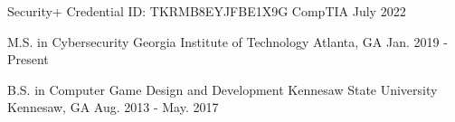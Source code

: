 \documentclass[11pt, a4paper]{awesome-cv}
\begin{document}




\begin{cvhonors}

  \cvhonor
    {Security+} %
    {Credential ID: TKRMB8EYJFBE1X9G} %
    {CompTIA} %
    {July 2022} %

\end{cvhonors}



\begin{cventries}

  \cventry
    {M.S. in Cybersecurity} %
    {Georgia Institute of Technology} %
    {Atlanta, GA} %
    {Jan. 2019 - Present} %
    {
    }

  \cventry
    {B.S. in Computer Game Design and Development} %
    {Kennesaw State University} %
    {Kennesaw, GA} %
    {Aug. 2013 - May. 2017} %
    {
    }

\end{cventries}

\end{document}
